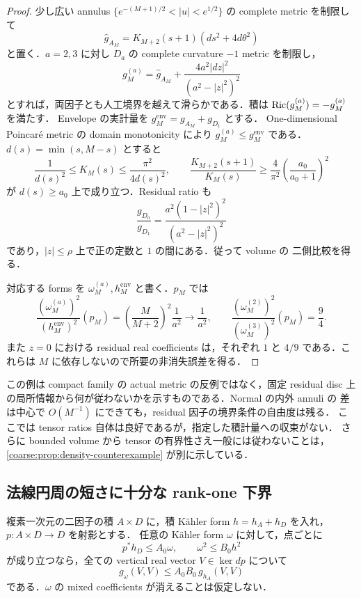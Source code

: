 \begin{proof}
少し広い annulus
$\{e^{-(M+1)/2}<|u|<e^{1/2}\}$ の complete metric を制限して
\[
 \widehat g_{A_M}
 =K_{M+2}(s+1)(ds^2+4d\theta^2)
\]
と置く．$a=2,3$ に対し $D_a$ の complete curvature $-1$ metric を制限し，
\[
 g_M^{(a)}=\widehat g_{A_M}
       +\frac{4a^2|dz|^2}{(a^2-|z|^2)^2}
\]
とすれば，両因子とも人工境界を越えて滑らかである．積は
$\operatorname{Ric}(g_M^{(a)})=-g_M^{(a)}$ を満たす．
Envelope の実計量を $g_M^{\mathrm{env}}=g_{A_M}+g_{D_1}$ とする．
One-dimensional Poincar\'e metric の domain monotonicity により
$g_M^{(a)}\le g_M^{\mathrm{env}}$ である．
$d(s)=\min(s,M-s)$ とすると
\[
 \frac1{d(s)^2}\le K_M(s)\le\frac{\pi^2}{4d(s)^2},\qquad
 \frac{K_{M+2}(s+1)}{K_M(s)}
 \ge\frac4{\pi^2}\left(\frac{a_0}{a_0+1}\right)^2
\]
が $d(s)\ge a_0$ 上で成り立つ．Residual ratio も
\[
 \frac{g_{D_a}}{g_{D_1}}
 =\frac{a^2(1-|z|^2)^2}{(a^2-|z|^2)^2}
\]
であり，$|z|\le\rho$ 上で正の定数と $1$ の間にある．従って volume の
二側比較を得る．

対応する forms を $\omega_M^{(a)},h_M^{\mathrm{env}}$ と書く．$p_M$ では
\[
 \frac{(\omega_M^{(a)})^2}{(h_M^{\mathrm{env}})^2}(p_M)
 =\left(\frac M{M+2}\right)^2\frac1{a^2}
 \longrightarrow\frac1{a^2},\qquad
 \frac{(\omega_M^{(2)})^2}{(\omega_M^{(3)})^2}(p_M)=\frac94.
\]
また $z=0$ における residual real coefficients は，それぞれ $1$ と $4/9$
である．これらは $M$ に依存しないので所要の非消失誤差を得る．
\end{proof}

この例は compact family の actual metric の反例ではなく，固定 residual disc
上の局所情報から何が従わないかを示すものである．Normal の内外 annuli の
差は中心で $O(M^{-1})$ にできても，residual 因子の境界条件の自由度は残る．
ここでは tensor ratios 自体は良好であるが，指定した積計量への収束がない．
さらに bounded volume から tensor の有界性さえ一般には従わないことは，
\cref{coarse:prop:density-counterexample} が別に示している．

\subsection{法線円周の短さに十分な rank-one 下界}

\begin{lemma}
\label{neck:lem:rank-one-circle}
複素一次元の二因子の積 $A\times D$ に，積 K\"ahler form
$h=h_A+h_D$ を入れ，$p:A\times D\to D$ を射影とする．
任意の K\"ahler form $\omega$ に対して，点ごとに
\begin{equation}\label{neck:eq:rank-one-inputs}
 p^*h_D\le A_0\omega,\qquad \omega^2\le B_0h^2
\end{equation}
が成り立つなら，全ての vertical real vector $V\in\ker dp$ について
\begin{equation}\label{neck:eq:vertical-upper}
 g_\omega(V,V)\le A_0B_0\,g_{h_A}(V,V)
\end{equation}
である．$\omega$ の mixed coefficients が消えることは仮定しない．
\end{lemma}

